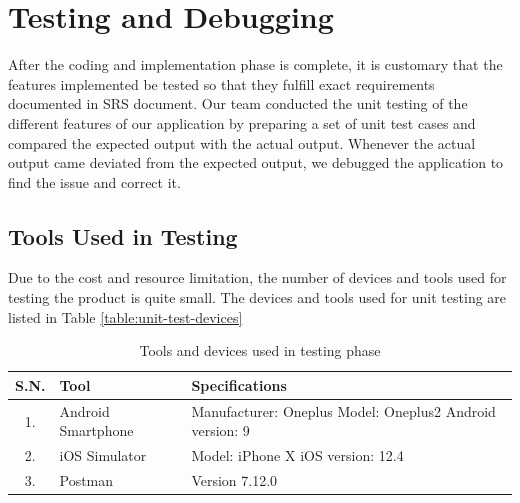 \documentclass[12pt, a4paper, oneside]{article}
\begin{document}
%
%
%
%
%


\pagebreak
\section{Testing and Debugging}
After the coding and implementation phase is complete, it is customary that the features implemented be tested so that they fulfill exact requirements documented in SRS document. Our team conducted the unit testing of the different features of our application by preparing a set of unit test cases and compared the expected output with the actual output. Whenever the actual output came deviated from the expected output, we debugged the application to find the issue and correct it.

\subsection{Tools Used in Testing}
Due to the cost and resource limitation, the number of devices and tools used for testing the product is quite small. The devices and tools used for unit testing are listed in Table \ref{table:unit-test-devices}

\begin{table}[H]
\begin{tabularx}{\linewidth}{|c|X|X|}
\hline
\rowcolor[HTML]{C0C0C0} 
S.N. & Tool               & Specifications                                            \\ \hline
1.   & Android Smartphone & Manufacturer: Oneplus \newline Model: Oneplus2 \newline Android version: 9 \\ \hline
2.   & iOS Simulator      & Model: iPhone X \newline iOS version: 12.4                        \\ \hline
3.   & Postman            & Version 7.12.0                                           \\ \hline
\end{tabularx}
\caption{Tools and devices used in testing phase}
\end{table}
\end{document}
